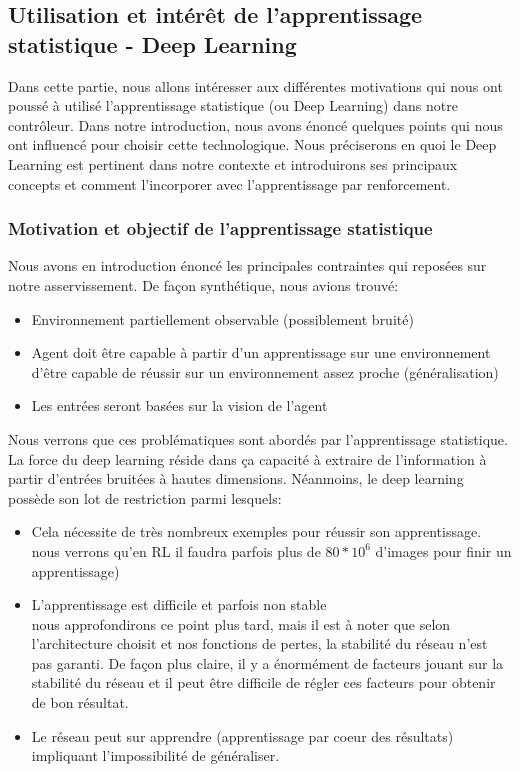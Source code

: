 \subsection{Utilisation et intérêt de l'apprentissage statistique - Deep Learning }

Dans cette partie, nous allons intéresser aux différentes motivations qui nous ont poussé à utilisé l'apprentissage statistique (ou Deep Learning) dans notre contrôleur. Dans notre introduction, nous avons énoncé quelques points qui nous ont influencé pour choisir cette technologique. Nous préciserons en quoi le Deep Learning est pertinent dans notre contexte et introduirons ses principaux concepts et comment l'incorporer avec l'apprentissage par renforcement.

\subsubsection{Motivation et objectif de l'apprentissage statistique}

Nous avons en introduction énoncé les principales contraintes qui reposées sur notre asservissement. De façon synthétique, nous avions trouvé:
\begin{itemize}
\item Environnement partiellement observable (possiblement bruité)
\item Agent doit être capable à partir d'un apprentissage sur une environnement d'être capable de réussir sur un environnement assez proche (généralisation)
\item Les entrées seront basées sur la vision de l'agent
\end{itemize}

Nous verrons que ces problématiques sont abordés par l'apprentissage statistique. La force du deep learning réside dans ça capacité à extraire de l'information à partir d'entrées bruitées à hautes dimensions. Néanmoins, le deep learning possède son lot de restriction parmi lesquels: 

\begin{itemize}
\item Cela nécessite de très nombreux exemples pour réussir son apprentissage.\\nous verrons qu'en RL il faudra parfois plus de $80*10^6$ d'images pour finir un apprentissage)
\item L'apprentissage est difficile et parfois non stable\\nous approfondirons ce point plus tard, mais il est à noter que selon l'architecture choisit et nos fonctions de pertes, la stabilité du réseau n'est pas garanti. De façon plus claire, il y a énormément de facteurs jouant sur la stabilité du réseau et il peut être difficile de régler ces facteurs pour obtenir de bon résultat. 
\item Le réseau peut sur apprendre (apprentissage par coeur des résultats) impliquant l'impossibilité de généraliser.
\end{itemize}

